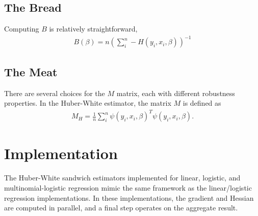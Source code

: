 \documentclass[12pt]{article}
\begin{document}
\subsection{The Bread}
Computing $B$ is relatively straightforward, 
\begin{align}
B(\beta) = n\left(\sum_i^n -H(y_i, x_i, \beta) \right)^{-1}
\end{align}

\subsection{The Meat}
There are several choices for the $M$ matrix, each with different robustness properties.  In the Huber-White estimator, the matrix $M$ is defined as
\begin{align}
M_{H} =\frac{1}{n} \sum_i^n \psi(y_i,x_i, \beta)^T  \psi(y_i,x_i, \beta).
\end{align}

%


\section{Implementation}

The Huber-White sandwich estimators implemented for linear, logistic, and multinomial-logistic regression mimic the same framework as  the linear/logistic regression implementations.  In these implementations, the gradient and Hessian are computed in parallel, and a final step operates on the aggregate result.  
\end{document}
